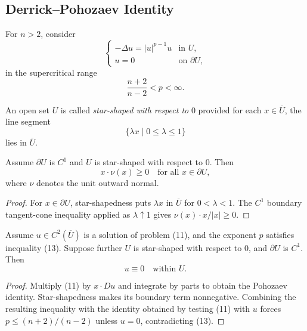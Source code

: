 \subsection{Derrick--Pohozaev Identity}
\label{sec:derrick-pohozaev-identity}

For $n>2$, consider
\[
\begin{cases}
-\Delta u=|u|^{p-1}u & \text{in }U,\\
u=0 & \text{on }\partial U,
\end{cases}
\tag{11}
\]
in the supercritical range
\[
\frac{n+2}{n-2}<p<\infty.
\tag{13}
\]

\begin{definition}
\label{def:star-shaped-domain}
An open set $U$ is called \textit{star-shaped with respect to} $0$ provided for each $x \in \overline{U}$, the line segment
\[
\{\lambda x \mid 0 \leq \lambda \leq 1\}
\]
lies in $\overline{U}$.
\end{definition}

\begin{lemma}
\label{lem:normals-star-shaped-region}

Assume $\partial U$ is $C^1$ and $U$ is star-shaped with respect to 0. Then
\[
x \cdot \nu(x) \geq 0 \quad \text{for all } x \in \partial U,
\]
where $\nu$ denotes the unit outward normal.
\end{lemma}

\begin{proof}
\sketch For $x\in\partial U$, star-shapedness puts $\lambda x$ in $\overline U$ for $0<\lambda<1$. The $C^1$ boundary tangent-cone inequality applied as $\lambda\uparrow1$ gives $\nu(x)\cdot x/|x|\geq0$.
\end{proof}

\begin{theorem}
\label{thm:derrick-pohozaev-nonexistence}

Assume $u \in C^2(\overline{U})$ is a solution of problem (11), and the exponent $p$ satisfies inequality (13). Suppose further $U$ is star-shaped with respect to 0, and $\partial U$ is $C^1$. Then
\[
u \equiv 0 \quad \text{within } U.
\]
\end{theorem}

\begin{proof}
\sketch Multiply (11) by $x\cdot Du$ and integrate by parts to obtain the Pohozaev identity. Star-shapedness makes its boundary term nonnegative. Combining the resulting inequality with the identity obtained by testing (11) with $u$ forces $p\leq(n+2)/(n-2)$ unless $u=0$, contradicting (13).
\end{proof}

